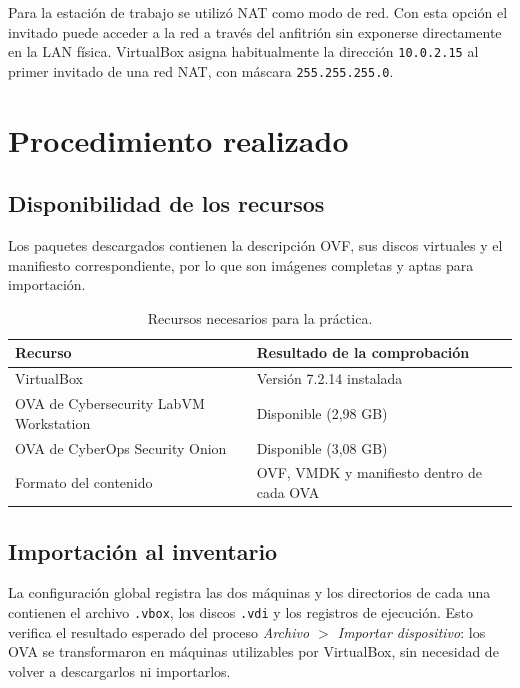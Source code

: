 \documentclass[11pt,a4paper]{article}
\begin{document}
Para la estación de trabajo se utilizó NAT como modo de red. Con esta opción el
invitado puede acceder a la red a través del anfitrión sin exponerse directamente
en la LAN física. VirtualBox asigna habitualmente la dirección \texttt{10.0.2.15}
al primer invitado de una red NAT, con máscara \texttt{255.255.255.0}.

\section{Procedimiento realizado}

\subsection{Disponibilidad de los recursos}

Los paquetes descargados contienen la descripción OVF, sus discos virtuales y el manifiesto correspondiente, 
por lo que son imágenes completas y aptas para importación.

\begin{table}[H]
    \centering
    \begin{tabular}{@{}ll@{}}
        \toprule
        Recurso & Resultado de la comprobación \\
        \midrule
        VirtualBox & Versión 7.2.14 instalada \\
        OVA de Cybersecurity LabVM Workstation & Disponible (2,98 GB) \\
        OVA de CyberOps Security Onion & Disponible (3,08 GB) \\
        Formato del contenido & OVF, VMDK y manifiesto dentro de cada OVA \\
        \bottomrule
    \end{tabular}
    \caption{Recursos necesarios para la práctica.}
    \label{tab:recursos}
\end{table}

\subsection{Importación al inventario}

La configuración global registra las dos máquinas y los directorios
de cada una contienen el archivo \texttt{.vbox}, los discos \texttt{.vdi} y
los registros de ejecución. Esto verifica el resultado esperado del proceso
\emph{Archivo $>$ Importar dispositivo}: los OVA se transformaron en máquinas
utilizables por VirtualBox, sin necesidad de volver a descargarlos ni
importarlos.
\end{document}

